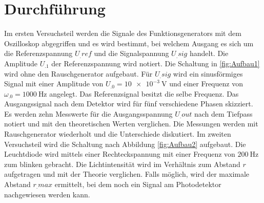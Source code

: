 
\section{Durchführung}
\label{sec:Durchführung}

Im ersten Versuchsteil werden die Signale des Funktionsgenerators mit dem Oszilloskop abgegriffen und es wird bestimmt, bei welchem Ausgang es sich um die Referenzspannung $U_.{ref}$ und die Signalspannung $U_.{sig}$ handelt. Die Amplitude $U_.1$ der Referenzspannung wird notiert.\newline
Die Schaltung in \ref{fig:Aufbau1} wird ohne den Rauschgenerator aufgebaut. Für $U_.{sig}$ wird ein sinusförmiges Signal mit einer Amplitude von $U_.0=\SI{10e-3}{\volt}$ und einer Frequenz von $\omega_.0=\SI{1000}{\hertz}$ angelegt. Das Referenzsignal besitzt die selbe Frequenz.
Das Ausgangssignal nach dem Detektor wird für fünf verschiedene Phasen skizziert. Es werden zehn Messwerte für die Ausgangsspannung $U_.{out}$ nach dem Tiefpass notiert und mit den theoretischen Werten verglichen.
Die Messungen werden mit Rauschgenerator wiederholt und die Unterschiede diskutiert.\newline
Im zweiten Versuchsteil wird die Schaltung nach Abbildung \ref{fig:Aufbau2} aufgebaut. Die Leuchtdiode wird mittels einer Rechteckspannung mit einer Frequenz von $\SI{200}{\hertz}$ zum blinken gebracht. Die Lichtintensität wird im Verhältnis zum Abstand $r$ aufgetragen und mit der Theorie verglichen. Falls möglich, wird der maximale Abstand $r_.{max}$ ermittelt, bei dem noch ein Signal am Photodetektor nachgewiesen werden kann.        